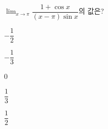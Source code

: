 $\displaystyle\lim_{x\to\pi}\dfrac{1+\cos x}{(x-\pi)\sin x}$의 값은?
\begin{choices32}{\rule[-3ex]{0pt}{8ex}$-\dfrac{1}{2}$}{\rule[-3ex]{0pt}{8ex}$-\dfrac{1}{3}$}{\rule[-3ex]{0pt}{8ex}$0$}{\rule[-3ex]{0pt}{8ex}$\dfrac{1}{3}$}{\rule[-3ex]{0pt}{8ex}$\dfrac{1}{2}$}\end{choices32}
